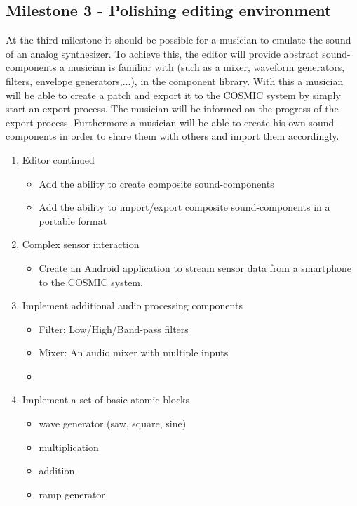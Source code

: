 \subsection{Milestone 3 - Polishing editing environment}

At the third milestone it should be possible for a musician to emulate the sound of an analog synthesizer. To achieve this, the editor will provide abstract sound-components a musician is familiar with (such as a mixer, waveform generators, filters, envelope generators,...), in the component library. With this a  musician will be able to create a patch and export it to the COSMIC system by simply start an export-process. The musician will be informed on the progress of the export-process. Furthermore a musician will be able to create his own sound-components in order to share them with others and import them accordingly.

	\begin{enumerate}
		\item Editor continued
			\begin{itemize}
				\item Add the ability to create composite sound-components
				\item Add the ability to import/export composite sound-components in a portable format
			\end{itemize}
		\item Complex sensor interaction
			\begin{itemize}
				\item Create an Android application to stream sensor data from a smartphone to the COSMIC system.
			\end{itemize}
		\item Implement additional audio processing components	
			\begin{itemize}
				\item Filter: Low/High/Band-pass filters
				\item Mixer: An audio mixer with multiple inputs
				\item 
			\end{itemize}
		\item Implement a set of basic atomic blocks
			\begin{itemize}
				\item wave generator (saw, square, sine)
				\item multiplication
				\item addition
				\item ramp generator
			\end{itemize}
	\end{enumerate}
	
